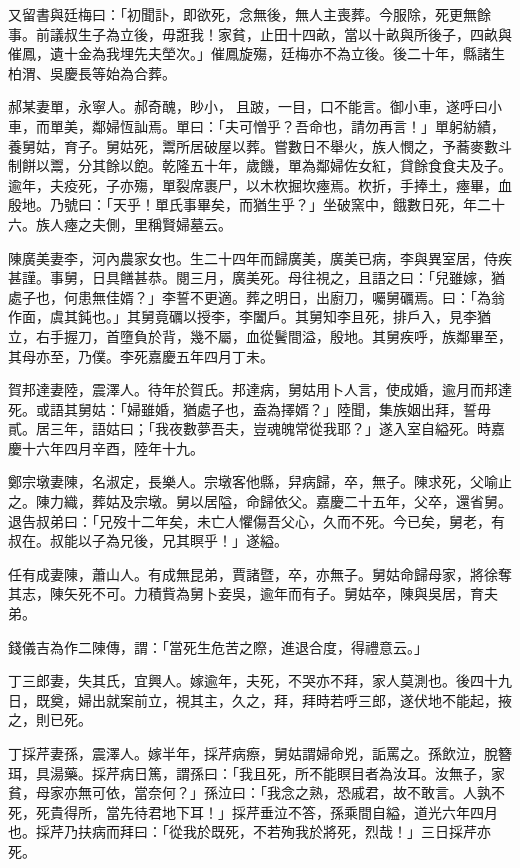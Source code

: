 \begin{pinyinscope}
又留書與廷梅曰：「初聞訃，即欲死，念無後，無人主喪葬。今服除，死更無餘事。前議叔生子為立後，毋誑我！家貧，止田十四畝，當以十畝與所後子，四畝與催鳳，遺十金為我埋先夫塋次。」催鳳旋殤，廷梅亦不為立後。後二十年，縣諸生柏渭、吳慶長等始為合葬。

郝某妻單，永寧人。郝奇醜，眇小，且跛，一目，口不能言。御小車，遂呼曰小車，而單美，鄰婦恆訕焉。單曰：「夫可憎乎？吾命也，請勿再言！」單躬紡績，養舅姑，育子。舅姑死，鬻所居破屋以葬。嘗數日不舉火，族人憫之，予蕎麥數斗制餅以鬻，分其餘以飽。乾隆五十年，歲饑，單為鄰婦佐女紅，貸餘食食夫及子。逾年，夫疫死，子亦殤，單裂席裹尸，以木杴掘坎瘞焉。杴折，手捧土，瘞畢，血殷地。乃號曰：「天乎！單氏事畢矣，而猶生乎？」坐破窯中，餓數日死，年二十六。族人瘞之夫側，里稱賢婦墓云。

陳廣美妻李，河內農家女也。生二十四年而歸廣美，廣美已病，李與異室居，侍疾甚謹。事舅，日具饍甚恭。閱三月，廣美死。母往視之，且語之曰：「兒雖嫁，猶處子也，何患無佳婿？」李誓不更適。葬之明日，出廚刀，囑舅礪焉。曰：「為翁作面，虞其鈍也。」其舅竟礪以授李，李闔戶。其舅知李且死，排戶入，見李猶立，右手握刀，首墮負於背，幾不屬，血從鬢間溢，殷地。其舅疾呼，族鄰畢至，其母亦至，乃僕。李死嘉慶五年四月丁未。

賀邦達妻陸，震澤人。待年於賀氏。邦達病，舅姑用卜人言，使成婚，逾月而邦達死。或語其舅姑：「婦雖婚，猶處子也，盍為擇婿？」陸聞，集族姻出拜，誓毋貳。居三年，語姑曰；「我夜數夢吾夫，豈魂魄常從我耶？」遂入室自縊死。時嘉慶十六年四月辛酉，陸年十九。

鄭宗墩妻陳，名淑定，長樂人。宗墩客他縣，舁病歸，卒，無子。陳求死，父喻止之。陳力織，葬姑及宗墩。舅以居隘，命歸依父。嘉慶二十五年，父卒，還省舅。退告叔弟曰：「兄歿十二年矣，未亡人懼傷吾父心，久而不死。今已矣，舅老，有叔在。叔能以子為兄後，兄其瞑乎！」遂縊。

任有成妻陳，蕭山人。有成無昆弟，賈諸暨，卒，亦無子。舅姑命歸母家，將徐奪其志，陳矢死不可。力積貲為舅卜妾吳，逾年而有子。舅姑卒，陳與吳居，育夫弟。

錢儀吉為作二陳傳，謂：「當死生危苦之際，進退合度，得禮意云。」

丁三郎妻，失其氏，宜興人。嫁逾年，夫死，不哭亦不拜，家人莫測也。後四十九日，既奠，婦出就案前立，視其主，久之，拜，拜時若呼三郎，遂伏地不能起，掖之，則已死。

丁採芹妻孫，震澤人。嫁半年，採芹病瘵，舅姑謂婦命兇，詬罵之。孫飲泣，脫簪珥，具湯藥。採芹病日篤，謂孫曰：「我且死，所不能瞑目者為汝耳。汝無子，家貧，母家亦無可依，當奈何？」孫泣曰：「我念之熟，恐戚君，故不敢言。人孰不死，死貴得所，當先待君地下耳！」採芹垂泣不答，孫乘間自縊，道光六年四月也。採芹乃扶病而拜曰：「從我於既死，不若殉我於將死，烈哉！」三日採芹亦死。


\end{pinyinscope}
